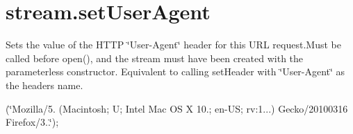 \hypertarget{stream_8setUserAgent-example}{}\section{stream.\+set\+User\+Agent}
Sets the value of the H\+T\+TP \char`\"{}\+User-\/\+Agent\char`\"{} header for this U\+RL request.\+Must be called before open(), and the stream must have been created with the parameterless constructor. Equivalent to calling set\+Header with \char`\"{}\+User-\/\+Agent\char`\"{} as the header\textquotesingle{}s name.

(\char`\"{}\+Mozilla/5. (\+Macintosh; U; Intel Mac O\+S X 10.; en-\/\+U\+S; rv\+:1...) Gecko/20100316 Firefox/3..\char`\"{});


\begin{DoxyCodeInclude}
\end{DoxyCodeInclude}
 